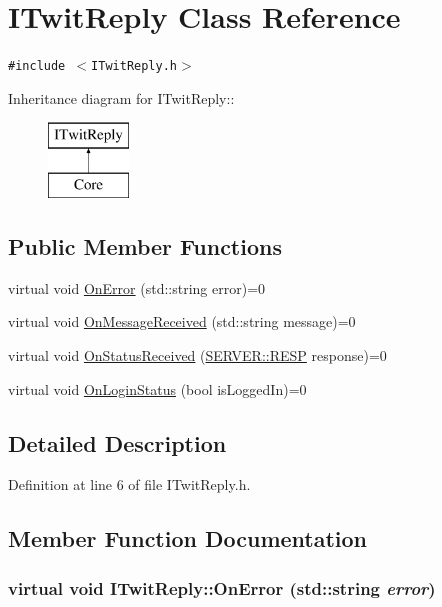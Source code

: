 \hypertarget{classITwitReply}{
\section{ITwitReply Class Reference}
\label{classITwitReply}
}
{\tt \#include $<$ITwitReply.h$>$}

Inheritance diagram for ITwitReply::\begin{figure}[H]
\begin{center}
\leavevmode
\includegraphics[height=2cm]{classITwitReply}
\end{center}
\end{figure}
\subsection*{Public Member Functions}
\begin{CompactItemize}
\item 
virtual void \hyperlink{classITwitReply_9cc4c9da62c570e6e076f2a7ce52b75a}{OnError} (std::string error)=0
\item 
virtual void \hyperlink{classITwitReply_a103f872024b0a36e669b0d82a26a528}{OnMessageReceived} (std::string message)=0
\item 
virtual void \hyperlink{classITwitReply_9011b418bb62f734a2e3cd447815ec90}{OnStatusReceived} (\hyperlink{namespaceSERVER_e274de6af58152c34520420007dfa0ea}{SERVER::RESP} response)=0
\item 
virtual void \hyperlink{classITwitReply_691e9bcbe06bd66233b1c870d2e4d67d}{OnLoginStatus} (bool isLoggedIn)=0
\end{CompactItemize}


\subsection{Detailed Description}


Definition at line 6 of file ITwitReply.h.

\subsection{Member Function Documentation}
\hypertarget{classITwitReply_9cc4c9da62c570e6e076f2a7ce52b75a}{
\subsubsection{\setlength{\rightskip}{0pt plus 5cm}virtual void ITwitReply::OnError (std::string {\em error})}}
\label{classITwitReply_9cc4c9da62c570e6e076f2a7ce52b75a}


